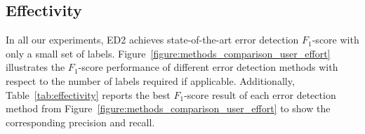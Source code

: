 \begin{table}[ht!]
	\centering
	\caption{Best $F_1$-score results of each method in Figure~\ref{figure:methods_comparison_user_effort} and their corresponding precision (P) and recall (R).}
	\label{tab:effectivity}
\end{table}


\subsection{Effectivity}
\label{sec:effectivity}

In all our experiments, ED2 achieves state-of-the-art error detection $F_1$-score with only a small set of labels.
Figure~\ref{figure:methods_comparison_user_effort} illustrates the $F_1$-score performance of different error detection methods with respect to the number of labels required if applicable. Additionally, Table~\ref{tab:effectivity} reports the best $F_1$-score result of each error detection method from Figure~\ref{figure:methods_comparison_user_effort} to show the corresponding precision and recall. 

